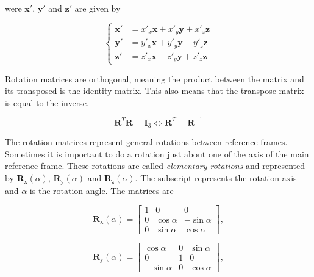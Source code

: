 were $\boldsymbol{x'}$, $\boldsymbol{y'}$ and $\boldsymbol{z'}$ are given by

\begin{equation}
    \left\{
    \begin{aligned}
        \boldsymbol{x'} &= x'_x\boldsymbol{x} + x'_y\boldsymbol{y} + x'_z\boldsymbol{z} \\
        \boldsymbol{y'} &= y'_x\boldsymbol{x} + y'_y\boldsymbol{y} + y'_z\boldsymbol{z} \\
        \boldsymbol{z'} &= z'_x\boldsymbol{x} + z'_y\boldsymbol{y} + z'_z\boldsymbol{z}
    \end{aligned}
    \right.
\end{equation}

Rotation matrices are orthogonal, meaning the product between the matrix and its transposed is the identity matrix. This also means that the transpose matrix is equal to the inverse.

\begin{equation}
    \boldsymbol{R}^T \boldsymbol{R} = \boldsymbol{I}_3 \Leftrightarrow \boldsymbol{R}^T = \boldsymbol{R}^{-1}
\end{equation}

The rotation matrices represent general rotations between reference frames. Sometimes it is important to do a rotation just about one of the axis of the main reference frame. These rotations are called \emph{elementary rotations} and represented by $\boldsymbol{R}_{\text{x}}(\alpha)$, $\boldsymbol{R}_{\text{y}}(\alpha)$ and $\boldsymbol{R}_{\text{z}}(\alpha)$. The subscript represents the rotation axis and $\alpha$ is the rotation angle. The matrices are

\begin{equation}
    \boldsymbol{R}_{\text{x}}(\alpha) = 
    \begin{bmatrix} 1 & 0 & 0\\
    0 & \cos{\alpha} & -\sin{\alpha}\\
    0 & \sin{\alpha} & \cos{\alpha}
    \end{bmatrix},
\end{equation}

\begin{equation}
    \boldsymbol{R}_{\text{y}}(\alpha) = \begin{bmatrix} \cos{\alpha} & 0 & \sin{\alpha}\\
    0 & 1 & 0\\
    -\sin{\alpha} & 0 & \cos{\alpha}
    \end{bmatrix},
\end{equation}

